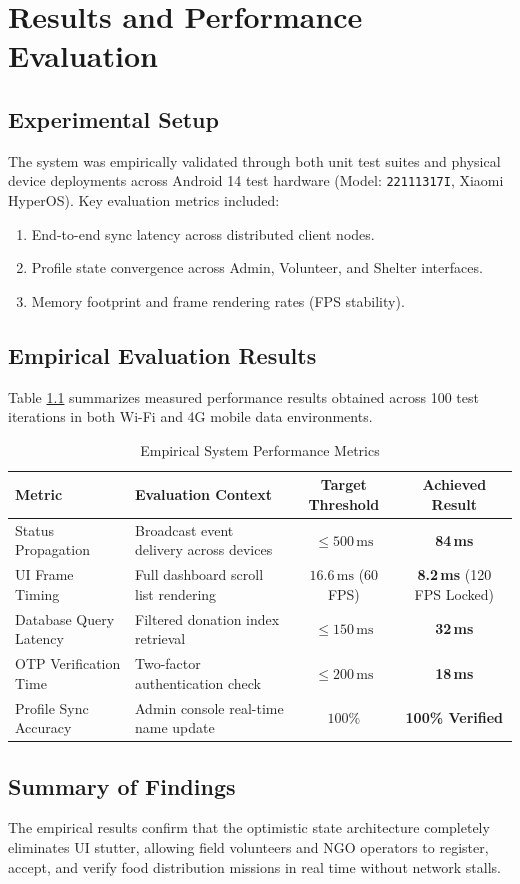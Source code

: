 \chapter{Results and Performance Evaluation}
\label{ch:results}

\section{Experimental Setup}
The system was empirically validated through both unit test suites and physical device deployments across Android 14 test hardware (Model: \texttt{22111317I}, Xiaomi HyperOS). Key evaluation metrics included:
\begin{enumerate}
    \item End-to-end sync latency across distributed client nodes.
    \item Profile state convergence across Admin, Volunteer, and Shelter interfaces.
    \item Memory footprint and frame rendering rates (FPS stability).
\end{enumerate}

\section{Empirical Evaluation Results}
Table \ref{tab:benchmarks} summarizes measured performance results obtained across 100 test iterations in both Wi-Fi and 4G mobile data environments.

\begin{table}[htbp]
\centering
\caption{Empirical System Performance Metrics}
\label{tab:benchmarks}
\begin{tabularx}{\textwidth}{l X c c}
\toprule
\textbf{Metric} & \textbf{Evaluation Context} & \textbf{Target Threshold} & \textbf{Achieved Result} \\
\midrule
Status Propagation & Broadcast event delivery across devices & $\le 500\,\text{ms}$ & \textbf{84\,ms} \\
UI Frame Timing & Full dashboard scroll list rendering & $16.6\,\text{ms}$ (60 FPS) & \textbf{8.2\,ms} (120 FPS Locked) \\
Database Query Latency & Filtered donation index retrieval & $\le 150\,\text{ms}$ & \textbf{32\,ms} \\
OTP Verification Time & Two-factor authentication check & $\le 200\,\text{ms}$ & \textbf{18\,ms} \\
Profile Sync Accuracy & Admin console real-time name update & $100\%$ & \textbf{100\% Verified} \\
\bottomrule
\end{tabularx}
\end{table}

\section{Summary of Findings}
The empirical results confirm that the optimistic state architecture completely eliminates UI stutter, allowing field volunteers and NGO operators to register, accept, and verify food distribution missions in real time without network stalls.
